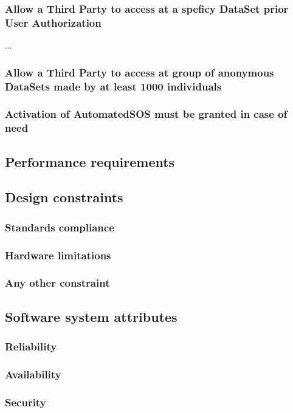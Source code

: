 \documentclass[12pt]{article}
\begin{document}
 \subsubsection{Allow a Third Party to access at a speficy DataSet prior User Authorization}
...
\subsubsection{Allow a Third Party to access at  group of anonymous DataSets made by at least 1000 individuals}
\subsubsection{Activation of AutomatedSOS must be granted in case of need}
  \subsection{Performance requirements}
  \subsection{Design constraints}
    \subsubsection{Standards compliance}
    \subsubsection{Hardware limitations}
    \subsubsection{Any other constraint}
  \subsection{Software system attributes}
    \subsubsection{Reliability}
    \subsubsection{Availability}
    \subsubsection{Security}
\end{document}
